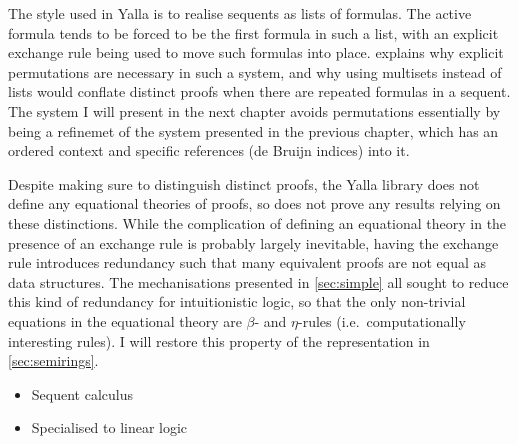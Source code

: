 The style used in Yalla is to realise sequents as lists of formulas.
The active formula tends to be forced to be the first formula in such a list,
with an explicit exchange rule being used to move such formulas into place.
 explains why explicit permutations are necessary in such a
system, and why using multisets instead of lists would conflate distinct proofs
when there are repeated formulas in a sequent.
The system I will present in the next chapter avoids permutations essentially by
being a refinemet of the system presented in the previous chapter, which has an
ordered context and specific references (de Bruijn indices) into it.

Despite making sure to distinguish distinct proofs, the Yalla library does not
define any equational theories of proofs, so does not prove any results relying
on these distinctions.
While the complication of defining an equational theory in the presence of an
exchange rule is probably largely inevitable, having the exchange rule
introduces redundancy such that many equivalent proofs are not equal as data
structures.
The mechanisations presented in \cref{sec:simple} all sought to reduce this kind
of redundancy for intuitionistic logic, so that the only non-trivial equations
in the equational theory are $\beta$- and $\eta$-rules (i.e.\ computationally
interesting rules).
I will restore this property of the representation in \cref{sec:semirings}.

\begin{itemize}
  \item Sequent calculus
  \item Specialised to linear logic
\end{itemize}
